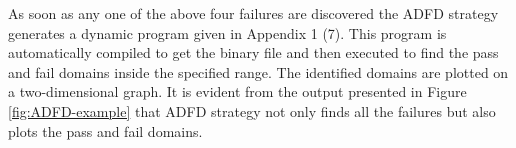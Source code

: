 As soon as any one of the above four failures are discovered the ADFD strategy generates a dynamic program given in Appendix 1 (7). This program is automatically compiled to get the binary file and then executed to find the pass and fail domains inside the specified range. The identified domains are plotted on a two-dimensional graph. It is evident from the output presented in Figure \ref{fig:ADFD-example} that ADFD strategy not only finds all the failures but also plots the pass and fail domains.

